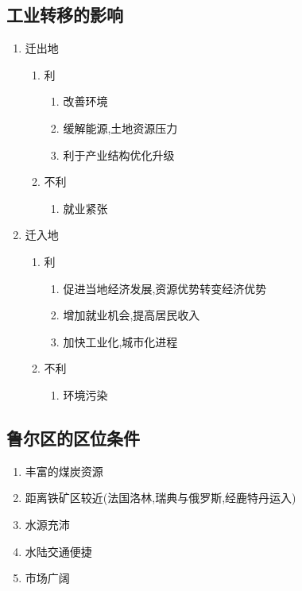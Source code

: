 \documentclass[a4paper]{article}
\begin{document}
    \subsection{工业转移的影响}
    \begin{enumerate}
        \item 迁出地
        \begin{enumerate}
            \item 利
            \begin{enumerate}
                \item 改善环境
                \item 缓解能源,土地资源压力
                \item 利于产业结构优化升级
            \end{enumerate}
            \item 不利
            \begin{enumerate}
                \item 就业紧张
            \end{enumerate}
        \end{enumerate}
        \item 迁入地
        \begin{enumerate}
            \item 利
            \begin{enumerate}
                \item 促进当地经济发展,资源优势转变经济优势
                \item 增加就业机会,提高居民收入
                \item 加快工业化,城市化进程
            \end{enumerate}
            \item 不利
            \begin{enumerate}
                \item 环境污染
            \end{enumerate}
        \end{enumerate}
    \end{enumerate}
    \subsection{鲁尔区的区位条件}
    \begin{enumerate}
        \item 丰富的煤炭资源
        \item 距离铁矿区较近(法国洛林,瑞典与俄罗斯,经鹿特丹运入)
        \item 水源充沛
        \item 水陆交通便捷
        \item 市场广阔
    \end{enumerate}
\end{document}
